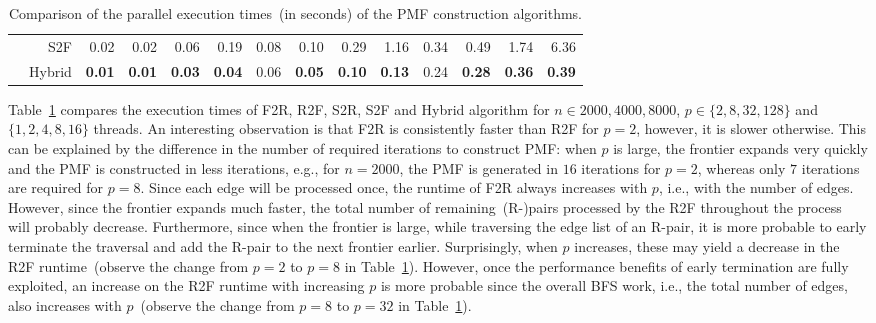 \documentclass[12pt]{article}
\begin{document}
\begin{table}[ht]
\begin{spacing}{1.2}
{\begin{tabular}{rr|rrrr|rrrr|rrrr}
				& S2F & 0.02 & 0.02 & 0.06 & 0.19 & 0.08 & 0.10 & 0.29 & 1.16 & 0.34 & 0.49 & 1.74 & 6.36 \\
		
				& Hybrid & \textbf{0.01} & \textbf{0.01} & \textbf{0.03} & \textbf{0.04} & 0.06 & \textbf{0.05} & \textbf{0.10} & \textbf{0.13} & 0.24 & \textbf{0.28} & \textbf{0.36} & \textbf{0.39}
			\end{tabular}
		}
	\end{spacing}
	\caption{Comparison of the parallel execution times~(in seconds) of the PMF construction algorithms.}
	\label{table:PMF_time}
\end{table}
\setlength{\tabcolsep}{6pt}


Table~\ref{table:PMF_time} compares the execution times of F2R, R2F, S2R, S2F and Hybrid algorithm for $n \in {2000, 4000, 8000}$, $p \in \{2, 8, 32, 128\}$ and $\{1, 2, 4, 8, 16\}$ threads. An interesting observation is that F2R is consistently faster than R2F for $p = 2$, however, it is slower otherwise. This can be explained by the difference in the number of required iterations to construct PMF: when $p$ is large, the frontier expands very quickly and the PMF is constructed in less iterations, e.g., for $n = 2000$, the PMF is generated in $16$ iterations for $p = 2$, whereas only $7$ iterations are required for $p = 8$. Since each edge will be processed once, the runtime of F2R always increases with $p$, i.e., with the number of edges. However, since the frontier expands much faster, the total number of remaining~(R-)pairs processed by the R2F throughout the process will probably decrease. Furthermore, since when the frontier is large, while traversing the edge list of an R-pair, it is more probable to early terminate the traversal and add the R-pair to the next frontier earlier. Surprisingly,  when $p$ increases, these may yield a decrease in the R2F runtime~(observe the change from $p = 2$ to $p = 8$ in Table~\ref{table:PMF_time}). However, once the performance benefits of early termination are fully exploited, an increase on the R2F runtime with increasing $p$ is more probable since the overall BFS work, i.e., the total number of edges, also increases with $p$~(observe the change from $p = 8$ to $p = 32$ in Table~\ref{table:PMF_time}).
\end{document}
